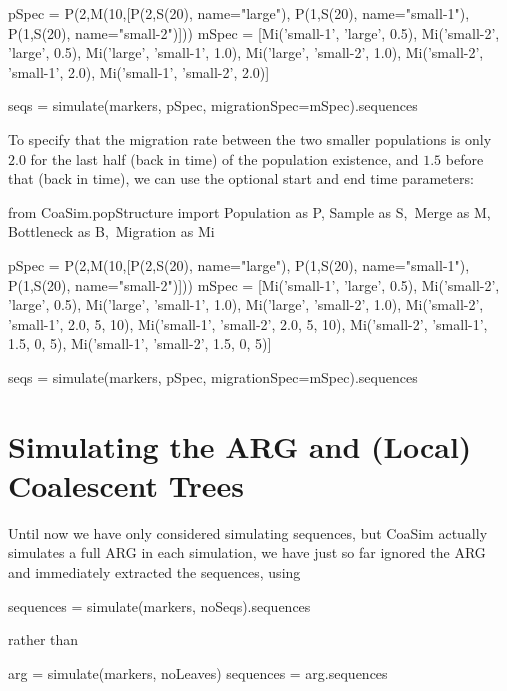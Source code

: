 \documentclass{manual}
\begin{document}
\begin{empfile}
\begin{code}
pSpec = P(2,M(10,[P(2,S(20), name="large"),
                  P(1,S(20), name="small-1"),
                  P(1,S(20), name="small-2")]))
mSpec = [Mi('small-1', 'large', 0.5),
         Mi('small-2', 'large', 0.5),
         Mi('large', 'small-1', 1.0),
         Mi('large', 'small-2', 1.0),
         Mi('small-2', 'small-1', 2.0),
         Mi('small-1', 'small-2', 2.0)]

seqs = simulate(markers, pSpec, migrationSpec=mSpec).sequences
\end{code}

To specify that the migration rate between the two smaller populations
is only $2.0$ for the last half (back in time) of the population
existence, and $1.5$ before that (back in time), we can use the
optional start and end time parameters:
\begin{code}
from CoaSim.popStructure import Population as P, Sample as S,\
                                Merge as M, Bottleneck as B,\
                                Migration as Mi

pSpec = P(2,M(10,[P(2,S(20), name="large"),
                  P(1,S(20), name="small-1"),
                  P(1,S(20), name="small-2")]))
mSpec = [Mi('small-1', 'large', 0.5),
         Mi('small-2', 'large', 0.5),
         Mi('large', 'small-1', 1.0),
         Mi('large', 'small-2', 1.0),
         Mi('small-2', 'small-1', 2.0, 5, 10),
         Mi('small-1', 'small-2', 2.0, 5, 10),
         Mi('small-2', 'small-1', 1.5, 0,  5),
         Mi('small-1', 'small-2', 1.5, 0,  5)]

seqs = simulate(markers, pSpec, migrationSpec=mSpec).sequences
\end{code}


\section{Simulating the ARG and (Local) Coalescent Trees}
\label{sec:simul-coal-trees}

Until now we have only considered simulating sequences, but CoaSim
actually simulates a full ARG in each simulation, we have just so far
ignored the ARG and immediately extracted the sequences, using
\begin{code}
sequences = simulate(markers, noSeqs).sequences
\end{code}
rather than
\begin{code}
arg = simulate(markers, noLeaves)
sequences = arg.sequences
\end{code}


\end{empfile}
\end{document}
